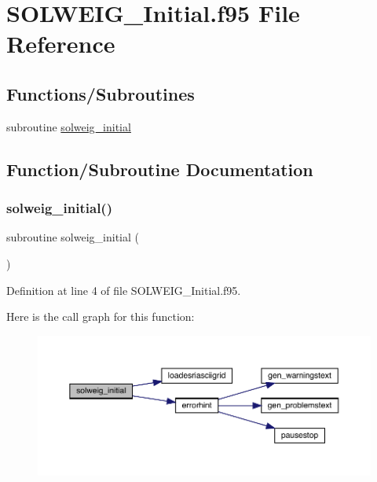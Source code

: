 \hypertarget{_s_o_l_w_e_i_g___initial_8f95}{}\section{S\+O\+L\+W\+E\+I\+G\+\_\+\+Initial.\+f95 File Reference}
\label{_s_o_l_w_e_i_g___initial_8f95}
\subsection*{Functions/\+Subroutines}
\begin{DoxyCompactItemize}
\item 
subroutine \hyperlink{_s_o_l_w_e_i_g___initial_8f95_a38ebc8b428ced6cac2d455130e1400f7}{solweig\+\_\+initial}
\end{DoxyCompactItemize}


\subsection{Function/\+Subroutine Documentation}
\mbox{\label{_s_o_l_w_e_i_g___initial_8f95_a38ebc8b428ced6cac2d455130e1400f7}} 
\subsubsection{\texorpdfstring{solweig\+\_\+initial()}{solweig\_initial()}}
{\footnotesize\ttfamily subroutine solweig\+\_\+initial (\begin{DoxyParamCaption}{ }\end{DoxyParamCaption})}



Definition at line 4 of file S\+O\+L\+W\+E\+I\+G\+\_\+\+Initial.\+f95.

Here is the call graph for this function\+:\nopagebreak
\begin{figure}[H]
\begin{center}
\leavevmode
\includegraphics[width=350pt]{_s_o_l_w_e_i_g___initial_8f95_a38ebc8b428ced6cac2d455130e1400f7_cgraph}
\end{center}
\end{figure}
